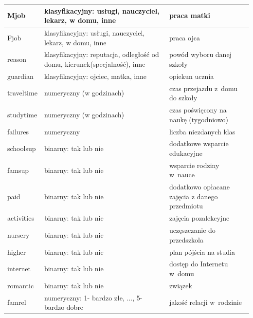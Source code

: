 \begin{table}[]
\begin{tabular}{|p{1.4cm}|p{3cm}|p{3cm}|}
\hline
Mjob   &    klasyfikacyjny: usługi, nauczyciel, lekarz, w domu, inne  &  praca matki  \\ \hline
Fjob   &    klasyfikacyjny: usługi, nauczyciel, lekarz, w domu, inne    &  praca ojca  \\ \hline
reason   &   klasyfikacyjny: reputacja, odległość od domu, kierunek(specjalność), inne   &   powód wyboru danej szkoły \\ \hline

guardian   & klasyfikacyjny: ojciec, matka, inne &  opiekun ucznia  \\ \hline
traveltime   &   numeryczny (w godzinach)    &   czas przejazdu z~domu do szkoły    \\ \hline
studytime   &   numeryczny (w godzinach)   &  czas poświęcony na naukę (tygodniowo)  \\ \hline
failures   &   numeryczny   & liczba niezdanych klas   \\ \hline
schoolsup   &  binarny: tak lub nie  & dodatkowe wsparcie edukacyjne   \\ \hline
famsup   &   binarny: tak lub nie   &   wsparcie rodziny w~nauce \\ \hline
paid  &  binarny: tak lub nie    &  dodatkowo opłacane zajęcia z danego przedmiotu  \\ \hline
activities   &  binarny: tak lub nie  &  zajęcia pozalekcyjne    \\ \hline
nursery   &   binarny: tak lub nie   &   uczęszczanie do przedszkola \\ \hline
higher   &  binarny: tak lub nie   &  plan pójścia na studia  \\ \hline
internet   &   binarny: tak lub nie   &  dostęp do Internetu w~domu  \\ \hline
romantic   &   binarny: tak lub nie   &   związek \\ \hline
famrel  &  numeryczny: 1- bardzo złe, ..., 5- bardzo dobre    & jakość relacji w~rodzinie  \\ \hline


\end{tabular}
\end{table}
